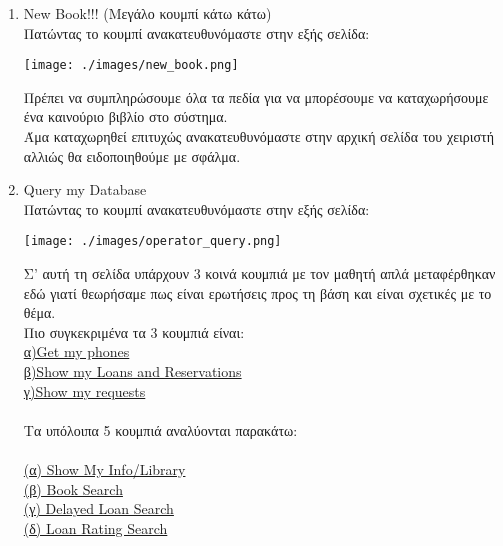 \documentclass[14pt]{report}
\begin{document}
\begin{enumerate}
		\newpage
		\hypertarget{o-new-book}{}
		\item New Book!!! (Μεγάλο κουμπί κάτω κάτω) \\
		Πατώντας το κουμπί ανακατευθυνόμαστε στην εξής σελίδα: \\
		
		\vspace{\baselineskip}
		
		\texttt{[image: ./images/new\_book.png]}
		
		\vspace{\baselineskip}
		
		Πρέπει να συμπληρώσουμε όλα τα πεδία για να μπορέσουμε να καταχωρήσουμε ένα καινούριο βιβλίο στο σύστημα. \\
		Άμα καταχωρηθεί επιτυχώς ανακατευθυνόμαστε στην αρχική σελίδα του χειριστή αλλιώς θα ειδοποιηθούμε με σφάλμα. 
		
		\newpage
		\hypertarget{o-query-database}{}
		\item Query my Database \\
		Πατώντας το κουμπί ανακατευθυνόμαστε στην εξής σελίδα: \\

		\vspace{\baselineskip}
		
		\texttt{[image: ./images/operator\_query.png]}
		
		\vspace{\baselineskip}
		
		Σ' αυτή τη σελίδα υπάρχουν 3 κοινά κουμπιά με τον μαθητή απλά μεταφέρθηκαν εδώ γιατί θεωρήσαμε πως είναι ερωτήσεις προς τη βάση και είναι σχετικές με το θέμα. \\
		Πιο συγκεκριμένα τα 3 κουμπιά είναι: \\
		\hyperlink{s-get-phones}{α)Get my phones} \\
		\hyperlink{s-show-loans}{β)Show my Loans and Reservations} \\
		\hyperlink{s-show-requests}{γ)Show my requests} \\ \\
		\newpage
		Τα υπόλοιπα 5 κουμπιά αναλύονται παρακάτω: \\ \\
		\hyperlink{o-show-info-lib}{ (α) Show My Info/Library} \\
		\hyperlink{o-book-search}{(β) Book Search} \\
		\hyperlink{o-delayed-loans}{(γ) Delayed Loan Search} \\
		\hyperlink{o-loan-rating}{(δ) Loan Rating Search} 
		

\end{enumerate}
\end{document}
